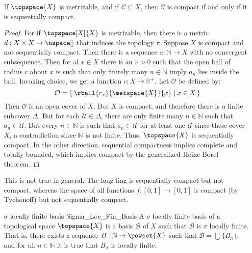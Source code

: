 \documentclass{article}                                                        %
\begin{document}
            \begin{theorem}
                \label{thm:Met_Space_Seq_Compact_iff_Compact}%
                If $\topspace{X}$ is metrizable, and if $\mathcal{C}\subseteq{X}$,
                then $\mathcal{C}$ is compact if and only if it is sequentially
                compact.
            \end{theorem}
            \begin{proof}
                For if $\topspace[X]{X}$ is metrizable, then there is a metric
                $d:X\times{X}\rightarrow\nspace[]$ that induces the topology $\tau$.
                Suppose $X$ is compact and not sequentially compact. Then there is a
                sequence $a:\mathbb{N}\rightarrow{X}$ with no convergent
                subsequence. Then for al $x\in{X}$ there is an $r>0$ such that the
                open ball of radius $r$ about $x$ is such that only finitely many
                $n\in\mathbb{N}$ imply $a_{n}$ lies inside the ball. Invoking
                choice, we get a function $r:X\rightarrow\mathbb{R}^{+}$. Let
                $\mathcal{O}$ be defined by:
                \begin{equation}
                    \mathcal{O}=\{\,\rball{r_{x}}{\metspace{X}}{x}\;|\;x\in{X}\,\}
                \end{equation}
                Then $\mathcal{O}$ is an open cover of $X$. But $X$ is compact, and
                therefore there is a finite subcover $\Delta$. But for each
                $\mathcal{U}\in\Delta$, there are only finite many
                $n\in\mathbb{N}$ such that $a_{n}\in\mathcal{U}$. But every
                $n\in\mathbb{N}$ is such that $a_{n}\in\mathcal{U}$ for at least
                one $\mathcal{U}$ since these cover $X$, a contradiction since
                $\mathbb{N}$ is not finite. Thus, $\topspace{X}$ is sequentially
                compact. In the other direction, sequential compactness implies
                complete and totally bounded, which implies compact by the
                generalized Heine-Borel theorem.
            \end{proof}
            This is not true in general. The long ling is sequentially compact but
            not compact, whereas the space of all functions
            $f:[0,1]\rightarrow[0,1]$ is compact (by Tychonoff) but not sequentially
            compact.
            \begin{fdefinition}{$\sigma$ locally finite basis}
                            {Sigma_Loc_Fin_Basis}
                A $\sigma$ locally finite basis of a topological space
                $\topspace{X}$ is a basis $\mathcal{B}$ of $X$ such that
                $\mathcal{B}$ is $\sigma$ locally finite. That is, there exists
                a sequence $B:\mathbb{N}\rightarrow\powset{X}$ such that
                $\mathcal{B}=\bigcup\{B_{n}\}$, and for all $n\in\mathbb{N}$ it is
                true that $B_{n}$ is locally finite.
            \end{fdefinition}
\end{document}
